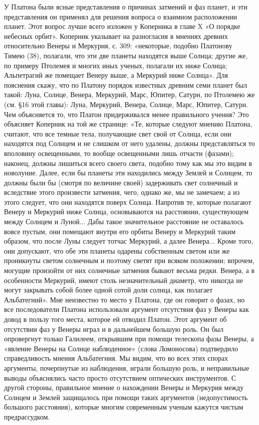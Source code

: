 У Платона были  ясные представления о причинах затмений  и фаз планет,
и  эти  представления  он  применял для  решения  вопроса  о  взаимном
расположении планет.  Этот вопрос  лучше всего  изложен у  Коперника в
главе X «О порядке небесных  орбит». Коперник указывает на разногласия
в мнениях древних относительно Венеры  и Меркурия, с. 309: «некоторые,
подобно Платонову Тимею (38), полагали,  что эти две планеты находятся
выше  Солнца; другие  же, по  примеру Птолемея  и многих  иных ученых,
полагали  их  ниже Солнца;  Альпетрагий  же  помещает Венеру  выше,  а
Меркурий ниже  Солнца». Для  пояснения скажу,  что по  Платону порядок
известных  древним  семи  планет  был  такой:  Луна,  Солнце,  Венера,
Меркурий,  Марс,  Юпитер,  Сатурн,  по   Птолемею  же  (см.  §16  этой
главы):  Луна, Меркурий,  Венера,  Солнце, Марс,  Юпитер, Сатурн.  Чем
объясняется  то, что  Платон придерживался  менее правильного  учения?
Это  объясняет  Коперник на  той  же  странице: «Те,  которые  следуют
мнению Платона,  считают, что  все темные  тела, получающие  свет свой
от  Солнца, если  они  находятся  под Солнцем  и  не  слишком от  него
удалены,  должны представляться  то вполовину  освещенными, то  вообще
освещенными  лишь отчасти  (фазами);  наконец,  должны лишиться  всего
своего  света, подобно  тому  как  мы это  видим  в новолуние.  Далее,
если  бы планеты  эти находились  между  Землей и  Солнцем, то  должны
были  бы  (смотря по  величине  своей)  задерживать свет  солнечный  и
вследствие этого произвести затмения, чего, однако же, мы не замечаем;
а  из  этого  следует,  что  они  находятся  поверх  Солнца.  Напротив
те,  которые  полагают Венеру  и  Меркурий  ниже Солнца,  основываются
на  расстоянии,  существующем  между  Солнцем и  Луной...  Дабы  такое
значительное  расстояние  не  оставалось вовсе  пустым,  они  помещают
внутри  его орбиты  Венеру и  Меркурий таким  образом, что  после Луны
следует тотчас Меркурий, а далее  Венера... Кроме того, они допускают,
что  обе эти  планеты  одарены собственным  светом  или же  проникнуты
светом  солнечным  и поэтому  светят  при  всяком положении;  впрочем,
могущие  произойти  от них  солнечные  затмения  бывают весьма  редки.
Венера, а в особенности  Меркурий, имеют столь незначительный диаметр,
что никогда  не могут закрывать  собой более одной сотой  доли солнца,
как полагает Альбатегний».  Мне неизвестно то место у  Платона, где он
говорит о  фазах, но  все последователи Платона  использовали аргумент
отсутствия фаз  у Венеры  как довод  в пользу  того места,  которое ей
отводил Платон.  Этот аргумент об  отсутствии фаз  у Венеры играл  и в
дальнейшем большую роль. Он был опровергнут только Галилеем, открывшим
при  помощи  телескопа  фазы  Венеры,  а  «явление  Венеры  на  Солнце
наблюденное»  (слова  Ломоносова)  подтвердило  справедливость  мнения
Альбатегния. Мы видим, что во  всех этих спорах аргументы, почерпнутые
из наблюдения, играли большую  роль, и неправильные выводы объяснялись
часто просто  отсутствием оптических  инструментов. С  другой стороны,
правильное  мнение  о  нахождении  Венеры  и  Меркурия  между  Солнцем
и  Землей  защищалось  при  помощи  таких  аргументов  (недопустимость
большого расстояния), которые многим современным ученым кажутся чистым
предрассудком.

